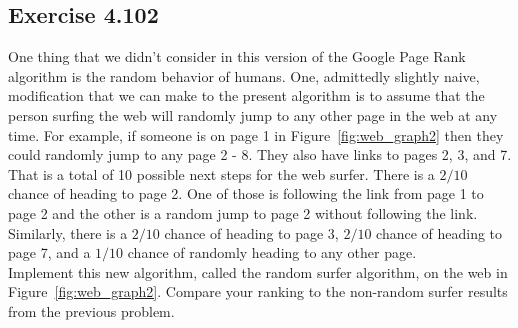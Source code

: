 \documentclass{article}
\begin{document}
\subsection*{Exercise 4.102}

One thing that we didn’t consider in this version of the Google Page Rank algorithm is the random behavior of humans. One, admittedly slightly naive, modification that we can make to the present algorithm is to assume that the person surfing the web will randomly jump to any other page in the web at any time. For example, if someone is on page 1 in
Figure~\ref{fig:web_graph2} then they could randomly jump to any page 2 - 8. They also have links to pages 2, 3, and 7. That is a total of 10 possible next steps for the web surfer. There is a
$2/10$ chance of heading to page 2. One of those is following the link from page 1 to page 2 and the other is a random jump to page 2 without following the link. Similarly, there is a $2/10$ chance of heading to page 3, $2/10$ chance
of heading to page 7, and a $1/10$ chance of randomly heading to any other page.\\

\noindent Implement this new algorithm, called the random surfer algorithm, on the web in Figure~\ref{fig:web_graph2}.
Compare your ranking to the non-random surfer results from the previous problem.
\end{document}
